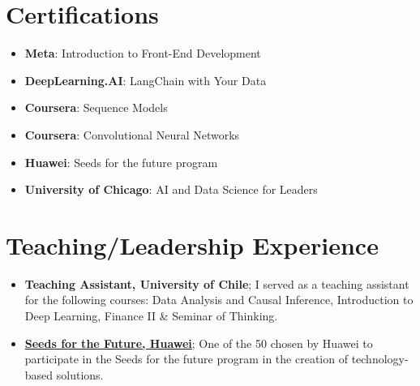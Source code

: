 \documentclass[letterpaper,11pt]{article}
\newcommand{\resumeItem}[2]{
  \item\small{
    \textbf{#1}{#2 \vspace{-2pt}}
  }
}
\newcommand{\resumeSubItem}[2]{\resumeItem{#1}{#2}\vspace{-4pt}}
\newcommand{\resumeSubItemcol}[2]{\resumeItem{#1}{#2}\vspace{-8pt}}
\newcommand{\resumeSubHeadingListStart}{\begin{itemize}[leftmargin=*]}
\newcommand{\resumeSubHeadingListEnd}{\end{itemize}}
\begin{document}
\section{Certifications}
\vspace{-15pt}
  \begin{multicols}{2}
    \resumeSubHeadingListStart
    \resumeSubItemcol{Meta}{: Introduction to Front-End Development}
    \resumeSubItemcol{DeepLearning.AI}{: LangChain with Your Data}
    \resumeSubItemcol{Coursera}{: Sequence Models}
    \resumeSubItemcol{Coursera}{: Convolutional Neural Networks}
    \resumeSubItemcol{Huawei}{: Seeds for the future program}
    \resumeSubItemcol{University of Chicago}{: AI and Data Science for Leaders}
  \resumeSubHeadingListEnd
  \end{multicols}
\section{Teaching/Leadership Experience}
 \resumeSubHeadingListStart
  \resumeSubItem
    {Teaching Assistant, University of Chile}
    {; I served as a teaching assistant for the following courses: Data Analysis and Causal Inference, Introduction to Deep Learning, Finance II \& Seminar of Thinking.}
  \resumeSubItem
    {\href{https://ingenieria.uchile.cl/noticias/188882/estudiantes-fcfm-destacaron-en-5ta-version-del-programa-huawei}{Seeds for the Future, Huawei}}
    {; One of the 50 chosen by Huawei to participate in the Seeds for the future program in the creation of technology-based solutions.}
  \resumeSubHeadingListEnd
\end{document}
